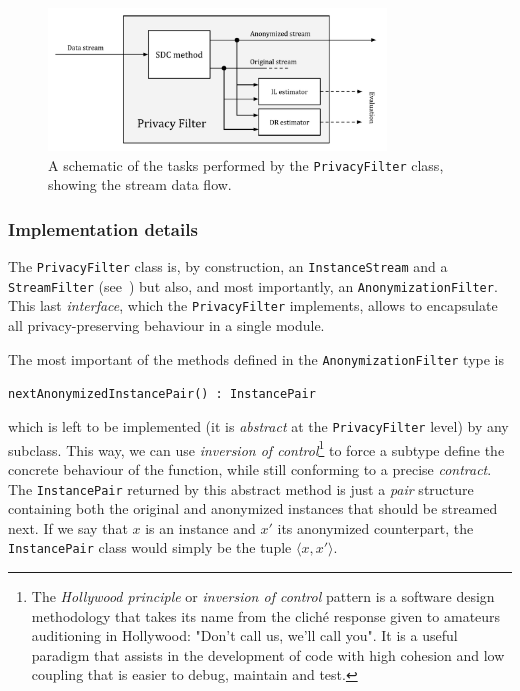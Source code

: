 \begin{figure}[h]
	\centering
	\includegraphics[width=0.8\textwidth]{figures/privacy-filter-schematic.pdf}
	\caption[\texttt{PrivacyFilter} data flow schematic.]{A schematic of the tasks performed by the \texttt{PrivacyFilter} class, showing the stream data flow.}
	\label{fig:privacy-filter-schematic}
\end{figure}

\subsubsection*{Implementation details}
\label{Implementation:PrivacyFilter:PrivacyFilter:Details}

The \texttt{PrivacyFilter} class is, by construction, an \texttt{InstanceStream} and a \texttt{StreamFilter} (see~) but also, and most importantly, an \texttt{AnonymizationFilter}. This last \textit{interface}, which the \texttt{PrivacyFilter} implements, allows to encapsulate all privacy-preserving behaviour in a single module.

The most important of the methods defined in the \texttt{AnonymizationFilter} type is

\begin{center}
	\texttt{nextAnonymizedInstancePair() : InstancePair}
\end{center}

which is left to be implemented (it is \textit{abstract} at the \texttt{PrivacyFilter} level) by any subclass. This way, we can use \textit{inversion of control}\footnote{The \textit{Hollywood principle} or \textit{inversion of control} pattern is a software design methodology that takes its name from the cliché response given to amateurs auditioning in Hollywood: "Don't call us, we'll call you". It is a useful paradigm that assists in the development of code with high cohesion and low coupling that is easier to debug, maintain and test.} to force a subtype define the concrete behaviour of the function, while still conforming to a precise \textit{contract}. The \texttt{InstancePair} returned by this abstract method is just a \textit{pair} structure containing both the original and anonymized instances that should be streamed next. If we say that $x$ is an instance and $x'$ its anonymized counterpart, the \texttt{InstancePair} class would simply be the tuple $\langle x, x' \rangle$.

